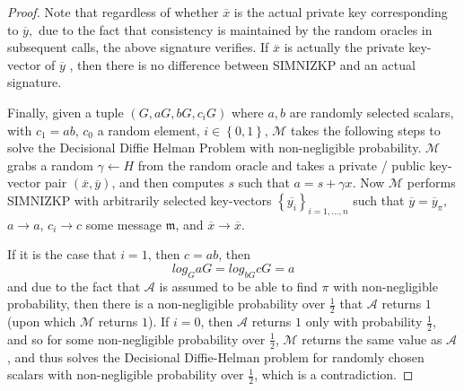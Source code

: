 \documentclass[12pt,english]{mrl}
\theoremstyle{definition}
\numberwithin{equation}{section}
\numberwithin{figure}{section}
\numberwithin{equation}{section}
\numberwithin{equation}{section}
\numberwithin{figure}{section}
\begin{document}
\begin{proof}
Note that regardless of whether $\overline{x}$ is the actual private
key corresponding to $\overline{y},$ due to the fact that consistency
is maintained by the random oracles in subsequent calls, the above
signature verifies. If $\overline{x}$ is actually the private key-vector
of $\overline{y}$ , then there is no difference between SIMNIZKP
and an actual signature. 

Finally, given a tuple $\left(G,aG,bG,c_{i}G\right)$ where $a,b$
are randomly selected scalars, with $c_{1}=ab$, $c_{0}$ a random
element, $i\in\left\{ 0,1\right\} $, $\mathcal{M}$ takes the following steps to solve the Decisional Diffie
Helman Problem with non-negligible probability. 
$\mathcal{M}$ grabs
a random $\gamma\leftarrow H$ from the random oracle and takes a
private / public key-vector pair $\left(\overline{x},\overline{y}\right)$,
and then computes $s$ such that $a=s+\gamma x$. Now $\mathcal{M}$
performs SIMNIZKP with arbitrarily selected key-vectors $\left\{ \overline{y_{i}}\right\} _{i=1,...,n}$
such that $\overline{y}=\overline{y}_{\pi},$ $a\to a$, $c_{i}\to c$
some message $\mathfrak{m}$, and $\overline{x}\to\overline{x}$. 

If it is the case that $i=1$, then $c=ab$, then 
\[
log_{G}aG=log_{bG}cG=a
\]
 and due to the fact that $\mathcal{A}$ is assumed to be able to
find $\pi$ with non-negligible probability, then there is a non-negligible
probability over $\frac{1}{2}$ that $\mathcal{A}$ returns $1$ (upon
which $\mathcal{M}$ returns $1$). If $i=0$, then $\mathcal{A}$
returns $1$ only with probability $\frac{1}{2}$, and so for some
non-negligible probability over $\frac{1}{2}$, $\mathcal{M}$ returns
the same value as $\mathcal{A}$, and thus solves the Decisional Diffie-Helman problem for randomly chosen scalars with non-negligible probability
over $\frac{1}{2}$, which is a contradiction. 
\end{proof}
\end{document}
